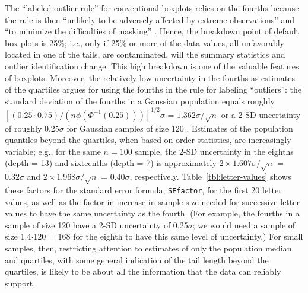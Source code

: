 \documentclass[oneside]{article}
\begin{document}
The ``labeled outlier rule'' for conventional boxplots relies on the fourths
because the rule is then ``unlikely to be adversely affected by extreme
observations'' and ``to minimize the difficulties of masking'' \citep[pg.
992]{dchbox}. Hence, the breakdown point of default box plots is 25\%; i.e.,
only if 25\% or more of the data values, all unfavorably located in one of the
tails, are contaminated, will the summary statistics and outlier
identification change. This high breakdown is one of the valuable features of
boxplots. Moreover, the relatively low uncertainty in the fourths as estimates
of the quartiles argues for using the fourths in the rule for labeling
``outliers'': the standard deviation of the fourths in a Gaussian population
equals roughly $[(0.25 \cdot 0.75) / (n \phi(\Phi^{-1}(0.25)))]^{1/2} \sigma$
= $1.362 \sigma / \sqrt{n}$ or a 2-SD uncertainty of roughly 0.25$\sigma$ for
Gaussian samples of size 120 \citep{ha.order}. Estimates of the population
quantiles beyond the quartiles, when based on order statistics, are
increasingly variable; e.g., for the same $n = 100$ sample, the 2-SD
uncertainty in the eighths (depth = 13) and sixteenths (depth = 7) is
approximately $ 2 \times 1.607 \sigma / \sqrt{n}$ = $0.32 \sigma$ and $ 2
\times 1.968 \sigma / \sqrt{n}$ = $0.40 \sigma$, respectively.
Table~\ref{tbl:letter-values} shows these factors for the standard error
formula, \texttt{SEfactor}, for the first 20 letter values, as well as the
factor in increase in sample size needed for successive letter values to have
the same uncertainty as the fourth. (For example, the fourths in a sample of
size 120 have a 2-SD uncertainty of 0.25$\sigma$; we would need a sample of
size 1.4$\cdot$120 = 168 for the eighth to have this same level of
uncertainty.) For small samples, then, restricting attention to estimates of
only the population median and quartiles, with some general indication of the
tail length beyond the quartiles, is likely to be about all the information
that the data can reliably support.
\end{document}
